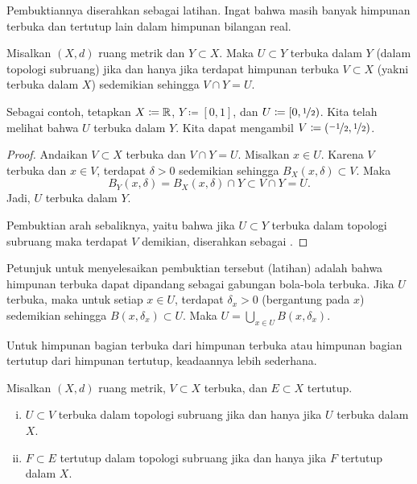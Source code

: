 Pembuktiannya diserahkan sebagai latihan.  Ingat bahwa
masih banyak himpunan terbuka dan
tertutup lain dalam himpunan bilangan real. %

\begin{prop} \label{prop:topology:subspaceopen}
Misalkan $(X,d)$ ruang metrik dan $Y \subset X$.  Maka $U \subset Y$
terbuka dalam $Y$ (dalam topologi subruang) jika dan hanya jika
terdapat himpunan terbuka $V \subset X$ (yakni terbuka dalam $X$) sedemikian sehingga
$V \cap Y = U$.
\end{prop}

Sebagai contoh, tetapkan $X \coloneqq {\mathbb{R}}$, $Y \coloneqq [0,1]$, dan $U \coloneqq [0,\nicefrac{1}{2})$.
Kita telah melihat bahwa $U$ terbuka dalam $Y$.
Kita dapat mengambil $V \coloneqq (\nicefrac{-1}{2},\nicefrac{1}{2})$.

\begin{proof}
Andaikan $V \subset X$ terbuka dan $V \cap Y = U$.
Misalkan $x \in U$.
Karena $V$ terbuka dan $x \in V$, terdapat
$\delta > 0$ sedemikian sehingga $B_X(x,\delta) \subset V$.
Maka
\begin{equation*}
B_Y(x,\delta) = B_X(x,\delta) \cap Y \subset V \cap Y = U .
\end{equation*}
Jadi, $U$ terbuka dalam $Y$.

Pembuktian arah sebaliknya, yaitu bahwa jika $U \subset Y$
terbuka dalam topologi subruang maka terdapat $V$ demikian, diserahkan sebagai
.
\end{proof}

Petunjuk untuk menyelesaikan pembuktian tersebut (latihan) adalah bahwa
himpunan terbuka dapat dipandang sebagai gabungan bola-bola terbuka.  Jika $U$
terbuka, maka untuk setiap $x \in U$, terdapat $\delta_x > 0$ (bergantung pada $x$) sedemikian sehingga
$B(x,\delta_x) \subset U$.  Maka $U = \bigcup_{x\in U} B(x,\delta_x)$.

Untuk himpunan bagian terbuka dari himpunan terbuka atau himpunan bagian tertutup dari himpunan
tertutup, keadaannya lebih sederhana.

\begin{prop} \label{prop:topology:subspacesame}
Misalkan $(X,d)$ ruang metrik, $V \subset X$ terbuka,
dan $E \subset X$ tertutup.
\begin{enumerate}[(i)]
\item \label{prop:topology:subspacesame:i}
$U \subset V$ terbuka dalam topologi subruang jika dan hanya jika $U$ terbuka
dalam $X$.
\item \label{prop:topology:subspacesame:ii}
$F \subset E$ tertutup dalam topologi subruang jika dan hanya jika $F$
tertutup dalam $X$.
\end{enumerate}
\end{prop}

